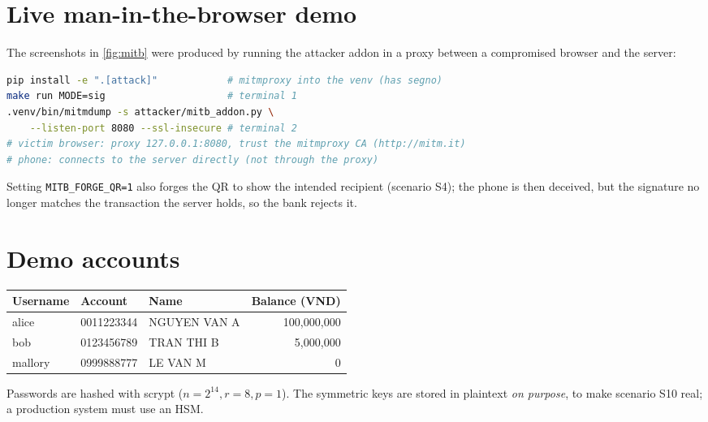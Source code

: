 \section{Live man-in-the-browser demo}\label{app:mitb}
The screenshots in \cref{fig:mitb} were produced by running the attacker addon in
a proxy between a compromised browser and the server:
\begin{lstlisting}[language=bash]
pip install -e ".[attack]"            # mitmproxy into the venv (has segno)
make run MODE=sig                     # terminal 1
.venv/bin/mitmdump -s attacker/mitb_addon.py \
    --listen-port 8080 --ssl-insecure # terminal 2
# victim browser: proxy 127.0.0.1:8080, trust the mitmproxy CA (http://mitm.it)
# phone: connects to the server directly (not through the proxy)
\end{lstlisting}
Setting \texttt{MITB\_FORGE\_QR=1} also forges the QR to show the intended
recipient (scenario S4); the phone is then deceived, but the signature no longer
matches the transaction the server holds, so the bank rejects it.

\section{Demo accounts}\label{app:accounts}
\begin{table}[H]
\centering\small
\begin{tabular}{@{}lllr@{}}
\toprule
Username & Account & Name & Balance (VND) \\
\midrule
alice   & 0011223344 & NGUYEN VAN A & 100{,}000{,}000 \\
bob     & 0123456789 & TRAN THI B   & 5{,}000{,}000 \\
mallory & 0999888777 & LE VAN M     & 0 \\
\bottomrule
\end{tabular}
\end{table}
Passwords are hashed with scrypt ($n=2^{14}, r=8, p=1$). The symmetric keys are
stored in plaintext \emph{on purpose}, to make scenario S10 real; a production
system must use an HSM.
